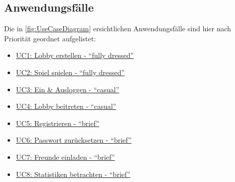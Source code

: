 \documentclass[11pt,ngerman]{article}
\newcommand{\quotes}[1]{``#1''}
\begin{document}
    \subsection{Anwendungsfälle}
    Die in \autoref{fig:UseCaseDiagram} ersichtlichen Anwendungsfälle sind hier nach Priorität geordnet aufgelistet:
    \begin{multicols}{2}
    	\begin{itemize}
    		\item  \hyperref[ssec:UC1Lobbyerstellen]{UC1: Lobby erstellen - \quotes{fully dressed}}
    		\item\hyperref[ssec:UC2Spielspielen]{UC2: Spiel spielen - \quotes{fully dressed}}
    		\item \hyperref[sssec:UC3EinAusloggen]{UC3: Ein \& Ausloggen  - \quotes{casual}}
    		\item \hyperref[sssec:UC4Lobbybeitreten]{UC4: Lobby beitreten - \quotes{casual}}
    		\item \hyperref[sssec:UC5Registrieren]{UC5: Registrieren - \quotes{brief}}
    		\item \hyperref[sssec:UC6Passwortsetzen]{UC6: Passwort zurücksetzen - \quotes{brief}}
    		\item  \hyperref[sssec:UC7Freundeeinladen]{UC7: Freunde einladen - \quotes{brief}}
    		\item \hyperref[sssec:UC8Statistikenbetrachten]{UC8: Statistiken betrachten - \quotes{brief}}
    	\end{itemize}
    \end{multicols}
\end{document}
